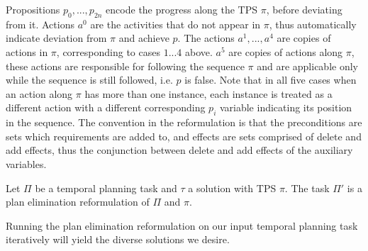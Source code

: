Propositions $p_0, ..., p_{2n}$ encode the progress along the TPS $\pi$, before deviating from it. 
Actions $a^0$ are the activities that do not appear in $\pi$, thus automatically indicate deviation from $\pi$ and achieve $p$.
The actions $a^1, ..., a^4$ are copies of actions in $\pi$, 
corresponding to cases $1...4$ above. 
$a^5$ are copies of actions along $\pi$, these actions are responsible for following the sequence $\pi$ and are applicable only while the sequence is still followed, i.e. $p$ is false. Note that in all five cases when an action along $\pi$ has more than one instance, each instance is treated as a different action with a different corresponding $p_i$ variable indicating its position in the sequence. The convention in the reformulation is that the preconditions are sets which requirements are added to, and effects are sets comprised of delete and add effects, thus the conjunction between delete and add effects of the auxiliary variables.

\begin{theorem}
Let $\Pi$ be a temporal planning task and $\tau$ a solution with TPS $\pi$. The task $\Pi'$ is a plan elimination reformulation of $\Pi$ and $\pi$.
\end{theorem}
Running the plan elimination reformulation on our input temporal planning task iteratively will yield the diverse solutions we desire.
